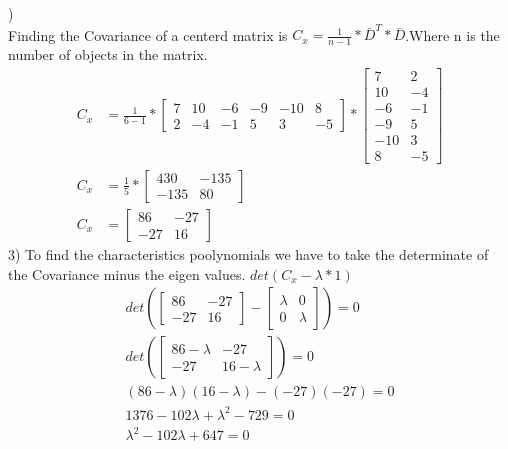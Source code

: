 \documentclass[12pt,english]{article}
\begin{document}
)\\
Finding the Covariance of a centerd matrix is $C_{x} = \frac{1}{n-1} * \bar{D}^{T}*\bar{D}$.Where n is the number of objects in the matrix. 
\begin{equation*}
\begin{split}
C_{x}&= \frac{1}{6-1}
*
\begin{bmatrix}7 & 10 & -6& -9 & -10 & 8\\2 & -4 & -1& 5 & 3 &-5\end{bmatrix}
*
\begin{bmatrix}7 &  2 \\10 & -4 \\-6 & -1 \\-9 &  5 \\-10 &  3 \\8 & -5 \end{bmatrix}\\
C_{x} &= \frac{1}{5}
*
\begin{bmatrix}430 & -135 \\-135 & 80\end{bmatrix}\\
C_{x} &= 
\begin{bmatrix}86 & -27 \\-27 & 16\end{bmatrix}
\end{split}
\end{equation*}
3) To find the characteristics poolynomials we have to take the determinate of the Covariance minus the eigen values. 
$det(C_{x} -\lambda *1)$
\begin{equation*}
\begin{split}
det(
\begin{bmatrix}86 & -27 \\-27 & 16\end{bmatrix}
- 
\begin{bmatrix}\lambda & 0 \\0 & \lambda\end{bmatrix}) = 0\\
det(
\begin{bmatrix}86 - \lambda & -27 \\-27 & 16 - \lambda
\end{bmatrix}) = 0\\
(86-\lambda)(16-\lambda) - (-27)(-27) = 0\\
1376 -102\lambda + \lambda^{2} - 729 = 0\\
\lambda^{2} -102\lambda + 647 = 0
\end{split}
\end{equation*}
\end{document}
